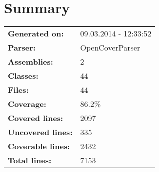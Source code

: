 \documentclass[a4paper,10pt]{article}
\begin{document}
\setcounter{secnumdepth}{-1}
\section{Summary}
\begin{longtable}[l]{ll}
\textbf{Generated on:} & 09.03.2014 - 12:33:52\\
\textbf{Parser:} & OpenCoverParser\\
\textbf{Assemblies:} & 2\\
\textbf{Classes:} & 44\\
\textbf{Files:} & 44\\
\textbf{Coverage:} & 86.2\%\\
\textbf{Covered lines:} & 2097\\
\textbf{Uncovered lines:} & 335\\
\textbf{Coverable lines:} & 2432\\
\textbf{Total lines:} & 7153\\
\end{longtable}
\end{document}
